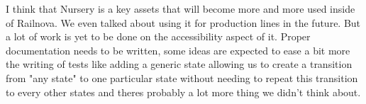 \documentclass[12pt]{article}
\theoremstyle{definition}
\theoremstyle{definition}
\theoremstyle{remark}
\begin{document}
I think that Nursery is a key assets that will become more and more used inside of Railnova. We even talked about using it for production lines in the future. But a lot of work is yet to be done on the accessibility aspect of it. Proper documentation needs to be written, some ideas are expected to ease a bit more the writing of tests like adding a generic state allowing us to create a transition from "any state" to one particular state without needing to repeat this transition to every other states and theres probably a lot more thing we didn't think about.


\appendix

\end{document}
